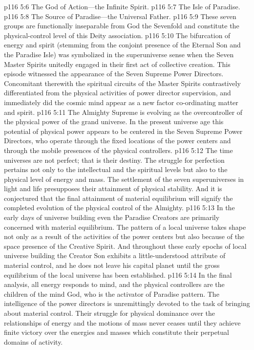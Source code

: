 \vs p116 5:6 \bibnobreakspace The God of Action---the Infinite Spirit.
\vs p116 5:7 \bibnobreakspace The Isle of Paradise.
\vs p116 5:8 \bibnobreakspace The Source of Paradise---the Universal Father.
\vs p116 5:9 These seven groups are functionally inseparable from God the Sevenfold and constitute the physical\hyp{}control level of this Deity association.
\pc \vs p116 5:10 The bifurcation of energy and spirit (stemming from the conjoint presence of the Eternal Son and the Paradise Isle) was symbolized in the superuniverse sense when the Seven Master Spirits unitedly engaged in their first act of collective creation. This episode witnessed the appearance of the Seven Supreme Power Directors. Concomitant therewith the spiritual circuits of the Master Spirits contrastively differentiated from the physical activities of power director supervision, and immediately did the cosmic mind appear as a new factor co\hyp{}ordinating matter and spirit.
\vs p116 5:11 The Almighty Supreme is evolving as the overcontroller of the physical power of the grand universe. In the present universe age this potential of physical power appears to be centered in the Seven Supreme Power Directors, who operate through the fixed locations of the power centers and through the mobile presences of the physical controllers.
\pc \vs p116 5:12 The time universes are not perfect; that is their destiny. The struggle for perfection pertains not only to the intellectual and the spiritual levels but also to the physical level of energy and mass. The settlement of the seven superuniverses in light and life presupposes their attainment of physical stability. And it is conjectured that the final attainment of material equilibrium will signify the completed evolution of the physical control of the Almighty.\plusone
\vs p116 5:13 In the early days of universe building even the Paradise Creators are primarily concerned with material equilibrium. The pattern of a local universe takes shape not only as a result of the activities of the power centers but also because of the space presence of the Creative Spirit. And throughout these early epochs of local universe building the Creator Son exhibits a little\hyp{}understood attribute of material control, and he does not leave his capital planet until the gross equilibrium of the local universe has been established.
\pc \vs p116 5:14 In the final analysis, all energy responds to mind, and the physical controllers are the children of the mind God, who is the activator of Paradise pattern. The intelligence of the power directors is unremittingly devoted to the task of bringing about material control. Their struggle for physical dominance over the relationships of energy and the motions of mass never ceases until they achieve finite victory over the energies and masses which constitute their perpetual domains of activity.
